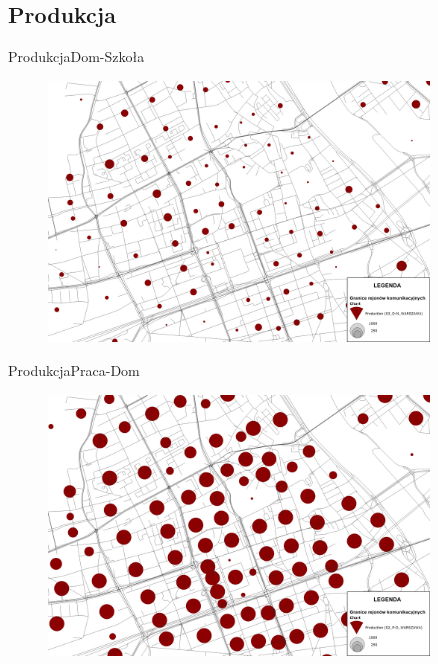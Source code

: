 \documentclass[8pt]{beamer}
\begin{document}
\subsection{Produkcja}
\begin{frame}{Produkcja}{Dom-Szkoła}
\begin{figure}\begin{center}
\includegraphics[width=0.9\textwidth]{prod_HE}
 \end{center}  \end{figure} 
\end{frame}

\begin{frame}{Produkcja}{Praca-Dom}
\begin{figure}\begin{center}
\includegraphics[width=0.9\textwidth]{prod_WH}
 \end{center}  \end{figure} 
\end{frame}
\end{document}
